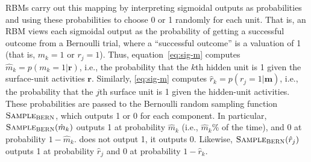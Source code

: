  RBMs carry out this mapping by interpreting sigmoidal outputs as probabilities and using these probabilities to choose 0 or 1 randomly for each unit. 
That is, an RBM views each sigmoidal output as the probability of getting a successful outcome from a Bernoulli trial, where a ``successful outcome'' is a valuation of 1 (that is, $m_k = 1$ or $r_j = 1$). Thus, equation~\eqref{eq:sig-m} computes $\hat{m}_k = p(m_{k}=1|\mathbf{r})$, i.e., the probability that the $k$th hidden unit is 1 given the surface-unit activities $\mathbf{r}$. Similarly, \eqref{eq:sig-m} computes $\hat{r}_k = p(r_{j}=1|\mathbf{m})$, i.e., the probability that the $j$th surface unit is 1 given the hidden-unit activities. 
These probabilities %
are passed to the Bernoulli random sampling function $\textsc{Sample}_{\textsc{BERN}}$, which outputs 1 or 0 for each component. In particular, 
$\textsc{Sample}_{\textsc{BERN}}(\hat{m}_k)$ outputs 1 at probability $\hat{m}_k$ (i.e., $\hat{m}_k$\% of the time), and 0 at probability $1 - \hat{m}_k$.
does not output 1, it outputs 0. Likewise, $\textsc{Sample}_{\textsc{BERN}}(\hat{r}_j)$ outputs 1 at probability $\hat{r}_j$ and 0 at probability $1 - \hat{r}_k$.

